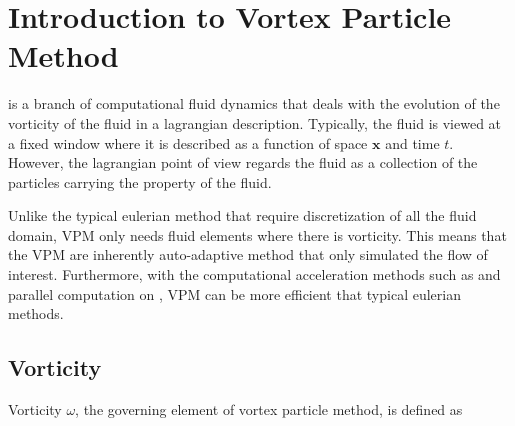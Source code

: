 


\section{Introduction to Vortex Particle Method}
 is a branch of computational fluid dynamics that deals with the evolution of the vorticity of the fluid in a lagrangian description. Typically, the fluid is viewed at a fixed window where it is described as a function of space $\mathbf{x}$ and time $t$. However, the lagrangian point of view regards the fluid as a collection of the particles carrying the property of the fluid. 


Unlike the typical eulerian method that require discretization of all the fluid domain, VPM only needs fluid elements where there is vorticity. This means that the VPM are inherently auto-adaptive method that only simulated the flow of interest. Furthermore, with the computational acceleration methods such as  and parallel computation on , VPM can be more efficient that typical eulerian methods.

\subsection{Vorticity}
Vorticity $\omega$, the governing element of vortex particle method, is defined as

